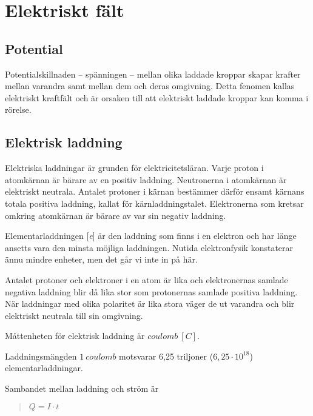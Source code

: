 \section{Elektriskt fält}
\label{elektriskafält}

\subsection{Potential}

Potentialskillnaden -- spänningen -- mellan olika laddade kroppar skapar
krafter mellan varandra samt mellan dem och deras omgivning.
Detta fenomen kallas elektriskt kraftfält och är orsaken till att elektriskt
laddade kroppar kan komma i rörelse.

\subsection{Elektrisk laddning}

Elektriska laddningar är grunden för elektricitetsläran.
Varje proton i atomkärnan är bärare av en positiv laddning.
Neutronerna i atomkärnan är elektriskt neutrala.
Antalet protoner i kärnan bestämmer därför ensamt kärnans totala positiva
laddning, kallat för kärnladdningstalet.
Elektronerna som kretsar omkring atomkärnan är bärare av var sin negativ
laddning.

Elementarladdningen [\emph{e}] är den laddning som finns i en elektron och har
länge ansetts vara den minsta möjliga laddningen.
Nutida elektronfysik konstaterar ännu mindre enheter, men det går vi inte in på
här.

Antalet protoner och elektroner i en atom är lika och elektronernas samlade
negativa laddning blir då lika stor som protonernas samlade positiva laddning.
När laddningar med olika polaritet är lika stora väger de ut varandra och blir
elektriskt neutrala till sin omgivning.

Måttenheten för elektrisk laddning är \(coulomb\ [C]\).

Laddningsmängden \(1\ coulomb\) motsvarar 6,25 triljoner (\(6,25\cdot10^{18}\))
elementarladdningar.

Sambandet mellan laddning och ström är

\begin{quote}
\(Q = I \cdot t\)
\end{quote}

